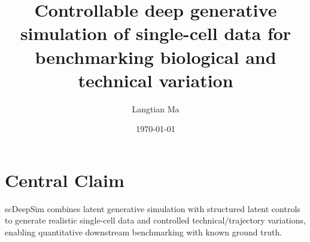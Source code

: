 \documentclass[11pt]{article}
\title{\vspace{-2.0em}Controllable deep generative simulation of single-cell data for benchmarking biological and technical variation}
\author{Langtian Ma}
\date{\vspace{-0.8em}\today}
\begin{document}
\maketitle
\vspace{-1.8em}

\section{Central Claim}

scDeepSim combines latent generative simulation with structured latent controls to generate realistic single-cell data and controlled technical/trajectory variations, enabling quantitative downstream benchmarking with known ground truth.
\end{document}
